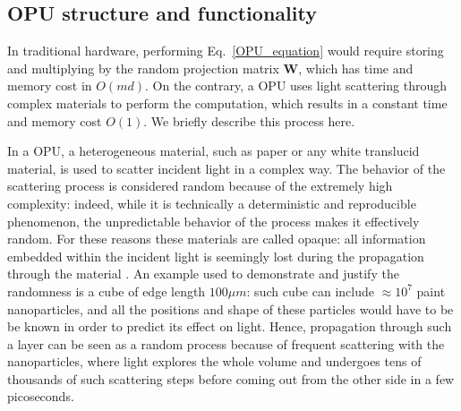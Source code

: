 \subsection{OPU structure and functionality}
In traditional hardware, performing Eq.~\eqref{OPU_equation} would require storing and multiplying by the random projection matrix $\mathbf{W}$, which has time and memory cost in $O(md)$. On the contrary, a OPU uses light scattering through complex materials to perform the computation, which results in a constant time and memory cost $O(1)$. We briefly describe this process here.

In a OPU, a heterogeneous material, such as paper or any white translucid material, is used to scatter incident light in a complex way. The behavior of the scattering process is considered random because of the extremely high complexity: indeed, while it is technically a deterministic and reproducible phenomenon, the unpredictable behavior of the process makes it effectively random. For these reasons these materials are called opaque: all information embedded within the incident light is seemingly lost during the propagation through the material \citep{saade_opu}. An example used to demonstrate and justify the randomness is a cube of edge length $100\mu m$: such cube can include $\approx 10^7$ paint nanoparticles, and all the positions and shape of these particles would have to be be known in order to predict its effect on light. Hence, propagation through such a layer can be seen as a random process because of frequent scattering with the nanoparticles, where light explores the whole volume and undergoes tens of thousands of such scattering steps before coming out from the other side in a few picoseconds.

